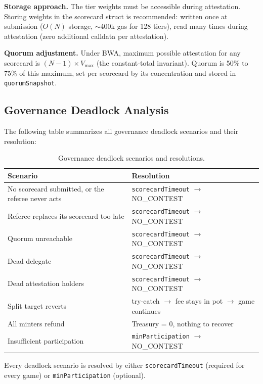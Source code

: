 \documentclass[11pt,a4paper]{article}
\begin{document}
\textbf{Storage approach.} The tier weights must be accessible during attestation. Storing weights in the scorecard struct is recommended: written once at submission ($O(N)$ storage, $\sim$400k gas for 128 tiers), read many times during attestation (zero additional calldata per attestation).

\textbf{Quorum adjustment.} Under BWA, maximum possible attestation for any scorecard is $(N-1) \times V_{\text{max}}$ (the constant-total invariant). Quorum is 50\% to 75\% of this maximum, set per scorecard by its concentration and stored in \texttt{quorumSnapshot}.

\subsection{Governance Deadlock Analysis}

The following table summarizes all governance deadlock scenarios and their resolution:

\begin{table}[H]
\centering
\begin{tabular}{ll}
\toprule
\textbf{Scenario} & \textbf{Resolution} \\
\midrule
No scorecard submitted, or the referee never acts & \texttt{scorecardTimeout} $\to$ NO\_CONTEST \\
Referee replaces its scorecard too late & \texttt{scorecardTimeout} $\to$ NO\_CONTEST \\
Quorum unreachable & \texttt{scorecardTimeout} $\to$ NO\_CONTEST \\
Dead delegate & \texttt{scorecardTimeout} $\to$ NO\_CONTEST \\
Dead attestation holders & \texttt{scorecardTimeout} $\to$ NO\_CONTEST \\
Split target reverts & try-catch $\to$ fee stays in pot $\to$ game continues \\
All minters refund & Treasury = 0, nothing to recover \\
Insufficient participation & \texttt{minParticipation} $\to$ NO\_CONTEST \\
\bottomrule
\end{tabular}
\caption{Governance deadlock scenarios and resolutions.}
\end{table}

Every deadlock scenario is resolved by either \texttt{scorecardTimeout} (required for every game) or \texttt{minParticipation} (optional).

\end{document}
